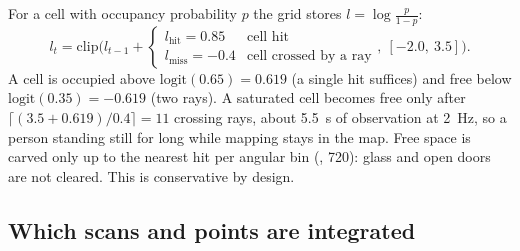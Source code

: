 For a cell with occupancy probability $p$ the grid stores $l = \log\frac{p}{1-p}$:
\begin{equation}
  l_t = \mathrm{clip}\Big(l_{t-1} + \begin{cases} l_{\mathrm{hit}} = 0.85 & \text{cell hit}\\
  l_{\mathrm{miss}} = -0.4 & \text{cell crossed by a ray} \end{cases},\ [-2.0,\ 3.5]\Big).
\end{equation}
A cell is occupied above $\mathrm{logit}(0.65) = 0.619$ (a single hit suffices) and free below
$\mathrm{logit}(0.35) = -0.619$ (two rays). A saturated cell becomes free only after
$\lceil (3.5 + 0.619)/0.4 \rceil = 11$ crossing rays, about 5.5~s of observation at 2~Hz, so a
person standing still for long while mapping stays in the map. Free space is carved only up to
the nearest hit per angular bin (, 720): glass and open doors are not
cleared. This is conservative by design.

\subsection{Which scans and points are integrated}

